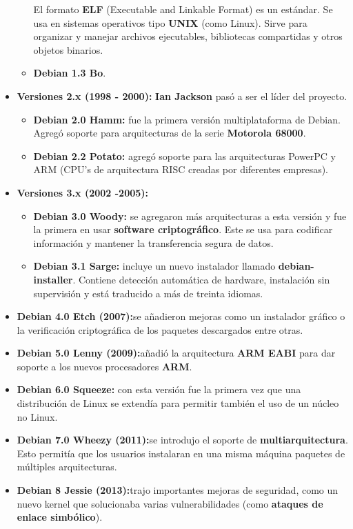 \documentclass[a4paper, 12pt]{book}
\begin{document}
\begin{itemize}
\begin{itemize}
		El formato \textbf{ELF} (Executable and Linkable Format) es un estándar. Se usa en sistemas operativos tipo \textbf{UNIX} (como Linux). Sirve para organizar y manejar archivos ejecutables, bibliotecas compartidas y otros objetos binarios.
		\item \textbf {Debian 1.3 Bo}.
	\end{itemize}
	\item \textbf {Versiones 2.x (1998 - 2000):} \textbf{Ian Jackson} pasó a ser el líder del proyecto.
	\begin{itemize}
		\item \textbf {Debian 2.0 Hamm: }fue la primera versión multiplataforma de Debian. Agregó soporte para arquitecturas de la serie \textbf{Motorola 68000}.
		\item \textbf {Debian 2.2 Potato: }agregó soporte para las arquitecturas  PowerPC y ARM (CPU's de arquitectura RISC creadas por diferentes empresas).
	\end{itemize}
	\item \textbf {Versiones 3.x (2002 -2005):}
	\begin{itemize}
		\item \textbf {Debian 3.0 Woody: }se agregaron más arquitecturas a esta versión y fue la primera en usar \textbf {software criptográfico}. Este se usa para codificar información y mantener la transferencia segura de datos.
		\item \textbf {Debian 3.1 Sarge: }incluye un nuevo instalador llamado \textbf {debian-installer}. Contiene detección automática de hardware, instalación sin supervisión y está traducido a más de treinta idiomas.
	\end{itemize}
	\item \textbf {Debian 4.0 Etch (2007):}se añadieron mejoras como un instalador gráfico o la verificación criptográfica de los paquetes descargados entre otras.
	\item \textbf {Debian 5.0 Lenny (2009):}añadió la arquitectura \textbf {ARM EABI} para dar soporte a los nuevos procesadores \textbf {ARM}.
	\item \textbf {Debian 6.0 Squeeze: }con esta versión fue la primera vez que una distribución de Linux se extendía para permitir también el uso de un núcleo no Linux.
	\item \textbf {Debian 7.0 Wheezy (2011):}se introdujo el soporte de \textbf {multiarquitectura}. Esto permitía que los usuarios instalaran en una misma máquina paquetes de múltiples arquitecturas.
	\item \textbf {Debian 8 Jessie (2013):}trajo importantes mejoras de seguridad, como un nuevo kernel que solucionaba varias vulnerabilidades (como \textbf {ataques de enlace simbólico}).

\end{itemize}
\end{document}
